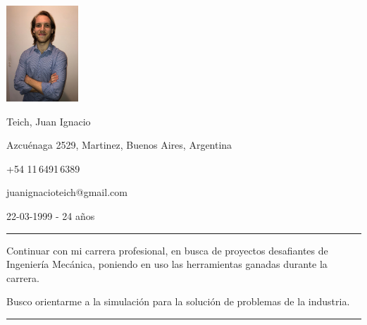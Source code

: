 \documentclass[a4paper,10pt]{article}
\newlength{\cvcolumngapwidth}
\newlength{\cvleftcolumnwidth}
\newlength{\cvrightcolumnwidth}
\newcommand{\cvnamestyle}[1]{{\Large\cvnamefont\textcolor{cvnamecolor}{#1}}}
\newcommand{\cvsectionstyle}[1]{{\normalsize\cvsectionfont\textcolor{cvsectioncolor}{#1}}}
\newcommand{\cvheadingstyle}[1]{{\normalsize\cvheadingfont\textcolor{cvheadingcolor}{#1}}}
\newlength{\cvafteritemskipamount}
\newlength{\cvaftersectionskipamount}
\newlength{\cvbetweensectionandheadingextraskipamount}
\newlength{\cvafternameskipamount}
\newlength{\cvafterpersonalinfolineskipamount}
\newlength{\cvparskip}
\newcommand{\cvpersonalinfo}[2]{
    \begin{minipage}[t]{\cvleftcolumnwidth}
        \vspace{0mm} %
        \raggedleft #1
    \end{minipage}%
    \hspace{\cvcolumngapwidth}%
    \begin{minipage}[t]{\cvrightcolumnwidth}
        \vspace{0mm} %
        #2
    \end{minipage}

    \vspace{\cvafteritemskipamount}
}
\newcommand{\cvname}[1]{
    \cvnamestyle{#1}

    \vspace{\cvafternameskipamount}
}
\newcommand{\cvpersonalinfolinewithicon}[3]{
    \raisebox{.5\fontcharht\font`E-.5\height}{\texttt{[image: \#2]}}
    #3

    \vspace{\cvafterpersonalinfolineskipamount}
}
\newcommand{\cvsection}[1]{
    \begin{minipage}[t]{\cvleftcolumnwidth}
        \raggedleft\cvsectionstyle{#1}
    \end{minipage}%
    \hspace{\cvcolumngapwidth}%
    \begin{minipage}[t]{\cvrightcolumnwidth}
        \textcolor{cvrulecolor}{\rule{\cvrightcolumnwidth}{0.3mm}}
    \end{minipage}

    \vspace{\cvaftersectionskipamount}
}
\newcommand{\cvitem}[2]{
    \begin{minipage}[t]{\cvleftcolumnwidth}
        \raggedleft #1
    \end{minipage}%
    \hspace{\cvcolumngapwidth}%
    \begin{minipage}[t]{\cvrightcolumnwidth}
        \setlength{\parskip}{\cvparskip} #2
    \end{minipage}

    \vspace{\cvafteritemskipamount}
}
\begin{document}

\cvpersonalinfo{
    \includegraphics[height=36mm]{../logos-photos/photo.jpg}
}{
    \cvname{Teich, Juan Ignacio}

    \cvpersonalinfolinewithicon{height=4mm}{../logos-photos/072-location.pdf}{
        Azcuénaga 2529, Martinez, Buenos Aires, Argentina
    }

    \cvpersonalinfolinewithicon{height=4mm}{../logos-photos/067-phone.pdf}{
        +54 11\,6491\,6389
    }

    \cvpersonalinfolinewithicon{height=4mm}{../logos-photos/070-envelop.pdf}{
        juanignacioteich@gmail.com
    }


        22-03-1999  -   24 años
}


\cvsection{OBJETIVOS PROFESIONALES}

\vspace{\cvbetweensectionandheadingextraskipamount}
\cvitem{\cvheadingstyle{}}{
    Continuar con mi carrera profesional, en busca de proyectos desafiantes de Ingeniería Mecánica, poniendo en uso las herramientas ganadas durante la carrera.

    Busco orientarme a la simulación para la solución de problemas de la industria.
}


\cvsection{EXPERIENCIA LABORAL}
\end{document}
